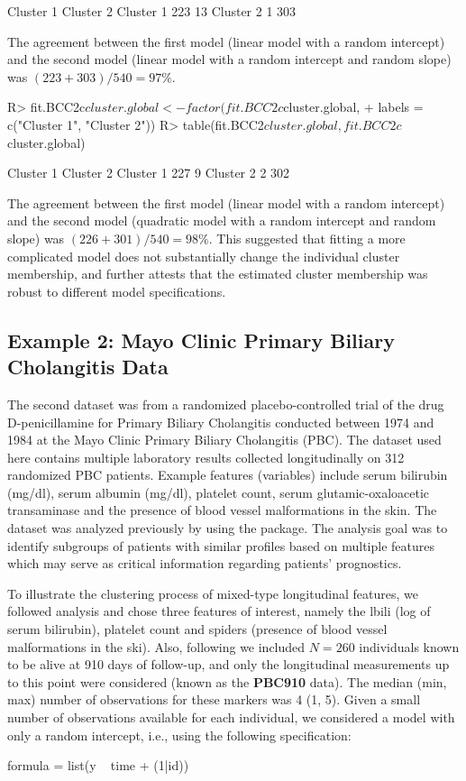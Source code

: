 \begin{example}
           Cluster 1 Cluster 2
  Cluster 1       223        13
  Cluster 2         1       303
\end{example}
The agreement between the first model (linear model with a random intercept) and the second model (linear model with a random intercept and random slope) was $(223 + 303)/540 = 97\%$. 
\begin{example}
R> fit.BCC2c$cluster.global <- factor(fit.BCC2c$cluster.global,
+        labels = c("Cluster 1", "Cluster 2"))
R> table(fit.BCC2$cluster.global, fit.BCC2c$cluster.global)
\end{example} 
\begin{example}
            Cluster 1 Cluster 2
  Cluster 1       227       9
  Cluster 2         2       302
\end{example}

The agreement between the first model (linear model with a random intercept) and the second model (quadratic model with a random intercept and random slope) was $(226 + 301)/540 = 98\%$. This suggested that fitting a more complicated model does not substantially change the individual cluster membership, and further attests that the estimated cluster membership was robust to different model specifications. 

\subsection{Example 2: Mayo Clinic Primary Biliary Cholangitis Data}
The second dataset was from a randomized placebo-controlled trial of the drug D-penicillamine for Primary Biliary Cholangitis conducted between 1974 and 1984 at the Mayo Clinic Primary Biliary Cholangitis (PBC). The dataset used here contains multiple laboratory results collected longitudinally on 312 randomized PBC patients.  Example features (variables) include serum bilirubin (mg/dl), serum albumin (mg/dl), platelet count, serum glutamic-oxaloacetic transaminase and the presence of blood vessel malformations in the skin. The dataset was analyzed previously by \citet{Komarek2013} using the  package. The analysis goal was to identify subgroups of patients with similar profiles based on multiple features which may serve as critical information regarding patients’ prognostics.

To illustrate the clustering process of mixed-type longitudinal features, we followed \citet{Komarek2013} analysis and chose three features of interest, namely the lbili (log of serum bilirubin), platelet count and spiders (presence of blood vessel malformations in the ski). Also, following \citet{Komarek2013} we included $N = 260$ individuals known to be alive at 910 days of follow-up, and only the longitudinal measurements up to this point were considered (known as the \textbf{PBC910} data). The median (min, max) number of observations for these markers was 4 (1, 5). Given a small number of observations available for each individual, we considered a model with only a random intercept, i.e., using the following specification:
\begin{example}
     		formula = list(y ~ time + (1|id))
\end{example} 

